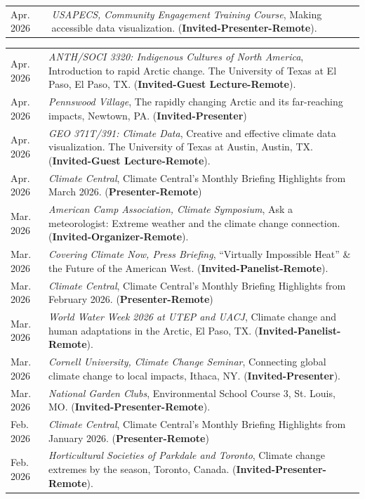 \documentclass[margin,line,palatino,courier,10pt]{res}
\begin{document}
\begin{resume}
\begin{tabular}{@{}p{0.9in}p{4in}}
Apr. 2026 & \textit{USAPECS, Community Engagement Training Course}, Making accessible data visualization. (\textbf{Invited-Presenter-Remote}).\\
\end{tabular}
\begin{tabular}{@{}p{0.9in}p{4in}}
Apr. 2026 & \textit{ANTH/SOCI 3320: Indigenous Cultures of North America}, Introduction to rapid Arctic change. The University of Texas at El Paso, El Paso, TX. (\textbf{Invited-Guest Lecture-Remote}).\\
Apr. 2026 & \textit{Pennswood Village}, The rapidly changing Arctic and its far-reaching impacts, Newtown, PA. (\textbf{Invited-Presenter})\\
Apr. 2026 & \textit{GEO 371T/391: Climate Data}, Creative and effective climate data visualization. The University of Texas at Austin, Austin, TX. (\textbf{Invited-Guest Lecture-Remote}).\\
Apr. 2026 & \textit{Climate Central}, Climate Central's Monthly Briefing Highlights from March 2026. (\textbf{Presenter-Remote})\\
Mar. 2026 & \textit{American Camp Association, Climate Symposium}, Ask a meteorologist: Extreme weather and the climate change connection. (\textbf{Invited-Organizer-Remote}).\\
Mar. 2026 & \textit{Covering Climate Now, Press Briefing}, ``Virtually Impossible Heat'' \& the Future of the American West. (\textbf{Invited-Panelist-Remote}).\\
Mar. 2026 & \textit{Climate Central}, Climate Central's Monthly Briefing Highlights from February 2026. (\textbf{Presenter-Remote})\\
Mar. 2026 & \textit{World Water Week 2026 at UTEP and UACJ}, Climate change and human adaptations in the Arctic, El Paso, TX. (\textbf{Invited-Panelist-Remote}).\\
Mar. 2026 & \textit{Cornell University, Climate Change Seminar}, Connecting global climate change to local impacts, Ithaca, NY. (\textbf{Invited-Presenter}).\\
Mar. 2026 & \textit{National Garden Clubs}, Environmental School Course 3, St. Louis, MO. (\textbf{Invited-Presenter-Remote}).\\
Feb. 2026 & \textit{Climate Central}, Climate Central's Monthly Briefing Highlights from January 2026. (\textbf{Presenter-Remote})\\
Feb. 2026 & \textit{Horticultural Societies of Parkdale and Toronto}, Climate change extremes by the season, Toronto, Canada. (\textbf{Invited-Presenter-Remote}).\\

\end{tabular}
\end{resume}
\end{document}
